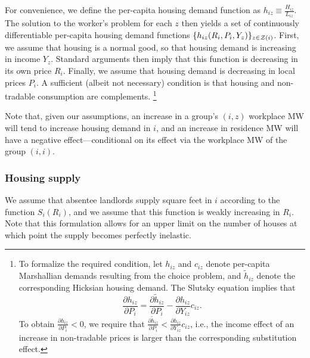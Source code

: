 For convenience, we define the per-capita housing demand function as 
$h_{iz} \equiv \frac{H_{iz}}{L_{iz}}$.
The solution to the worker's problem for each $z$ then yields a set of 
continuously differentiable per-capita housing demand functions 
$\{h_{iz} (R_i, P_i, Y_z)\}_{z\in\mathcal{Z}(i)}$.
First, we assume that housing is a normal good, so that housing demand is 
increasing in income $Y_z$.
Standard arguments then imply that this function is decreasing in its own price 
$R_i$.
Finally, we assume that housing demand is decreasing in local prices $P_i$.
A sufficient (albeit not necessary) condition is that housing and non-tradable
consumption are complements.%
\footnote{To formalize the required condition, let $h_{iz}$ and $c_{iz}$ denote 
per-capita Marshallian demands resulting from the choice problem, and 
$\tilde h_{iz}$ denote the corresponding Hicksian housing demand.
The Slutsky equation implies that
$$\frac{\partial h_{iz}}{\partial P_i}
   = \frac{\partial \tilde h_{iz}}{\partial P_i}
   - \frac{\partial h_{iz}}{\partial Y_{iz}} c_{iz}.$$
To obtain $\frac{\partial h_{iz}}{\partial P_i} < 0$, we require that
$\frac{\partial \tilde h_{iz}}{\partial P_i}
< \frac{\partial h_{iz}}{\partial Y_{iz}} c_{iz}$, i.e., the income effect of an
increase in non-tradable prices is larger than the corresponding substitution
effect.}

Note that, given our assumptions, 
an increase in a group's $(i,z)$ workplace MW will tend to increase housing 
demand in $i$, 
and an increase in residence MW will have a negative effect---conditional on 
its effect via the workplace MW of the group $(i,i)$.

\subsubsection*{Housing supply}

We assume that absentee landlords supply square feet in $i$ according to the 
function $S_i(R_i)$,
and we assume that this function is weakly increasing in $R_i$.
Note that this formulation allows for an upper limit on the number of houses at 
which point the supply becomes perfectly inelastic.

